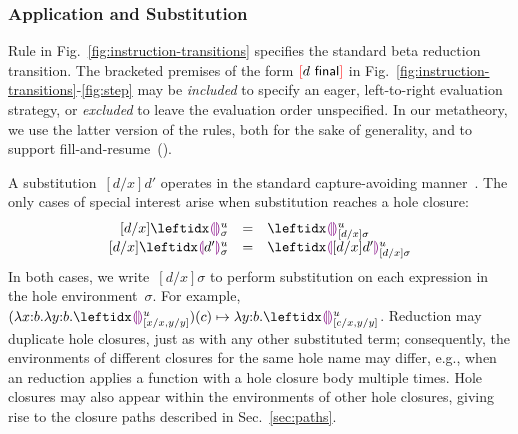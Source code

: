 

\subsubsection{Application and Substitution} 
%
Rule  in Fig.~\ref{fig:instruction-transitions} specifies the
standard beta reduction transition.
%
The bracketed premises of the form ${\textcolor{red}[}d~\mathsf{final}{\textcolor{red}]}$ in
Fig.~\ref{fig:instruction-transitions}-\ref{fig:step} may be \emph{included}
to specify an eager, left-to-right evaluation strategy, or \emph{excluded} to
leave the evaluation order unspecified.
%
In our metatheory, we use the latter version of the rules, both for
the sake of generality, and to support fill-and-resume~().

A substitution~$[d/x]d'$ operates in the standard capture-avoiding manner~\cite{pfpl}. 
%
The only cases of special interest arise when substitution reaches a hole closure:
\[
\begin{array}{rcl}
  [d/x]\dehole{u}{\sigma}{} & = & \dehole{u}{[d/x]\sigma}{} \\%
  \substitute{d}{x}{\dhole{d'}{u}{\sigma}{}} & = & \dhole{[d/x]d'}{u}{[d/x]\sigma}{}
\end{array}
\]
In both cases, we write~$[d/x]\sigma$ to perform substitution on each expression in the hole environment~$\sigma$. 
%
For example, $\stepsToD{}
    {\hap{(\halam{x}{b}{\halam{y}{b}{\dehole{u}{[x/x, y/y]}{}}})}{c}}
    {\halam{y}{b}{\dehole{u}{[c/x, y/y]}{}}}$. 
%
Reduction may duplicate hole closures, just as with any other substituted term;
%
consequently, the environments of different closures for the same hole name may differ, 
e.g., when an reduction applies a function with a hole closure body multiple times.%
%
Hole closures may also appear within the environments of other hole
closures, giving rise to the closure paths described in
Sec.~\ref{sec:paths}.

